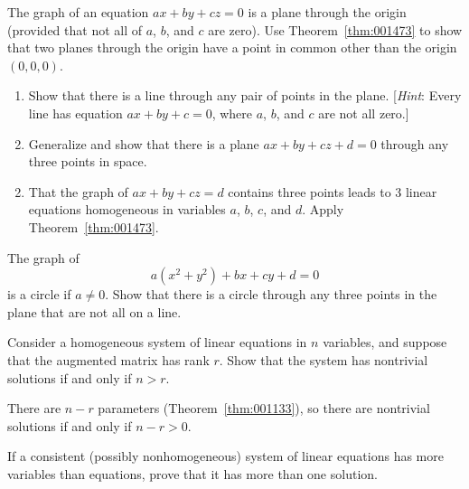 \begin{multicols}{2}
\begin{ex}
\begin{sol}
\begin{enumerate}[label={\alph*.}]
\end{enumerate}
\end{sol}
\end{ex}


\begin{ex}
The graph of an equation $ax + by + cz = 0$ is a plane through the origin (provided that not all of $a$, $b$, and $c$ are zero). Use Theorem~\ref{thm:001473} to show that two planes through the origin have a point in common other than the origin $(0, 0, 0)$.
\end{ex}

\begin{ex} %
\begin{enumerate}[label={\alph*.}]
\item Show that there is a line through any pair of points in the plane. [\textit{Hint}: Every line has equation $ax + by + c = 0$, where $a$, $b$, and $c$ are not all zero.]

\item Generalize and show that there is a plane $ax + by + cz + d = 0$ through any three points in space.

\end{enumerate}
\begin{sol}
\begin{enumerate}[label={\alph*.}]
\setcounter{enumi}{1}
\item  That the graph of $ax + by + cz = d$ contains three points leads to 3 linear equations homogeneous in variables $a$, $b$, $c$, and $d$. Apply Theorem~\ref{thm:001473}.

\end{enumerate}
\end{sol}
\end{ex}

\begin{ex} %
The graph of 
\begin{equation*}
a(x^2 + y^2) + bx + cy + d = 0
\end{equation*}
 is a circle if $a \neq 0$. Show that there is a circle through any three points in the plane that are not all on a line.
\end{ex}

\begin{ex} %
Consider a homogeneous system of linear equations in $n$ variables, and suppose that the augmented matrix has rank $r$. Show that the system has nontrivial solutions if and only if $n > r$.

\begin{sol}
There are $n - r$ parameters (Theorem~\ref{thm:001133}), so there are nontrivial solutions if and only if $n - r > 0$.
\end{sol}
\end{ex}

\begin{ex} %
If a consistent (possibly nonhomogeneous) system of linear equations has more variables than equations, prove that it has more than one solution.
\end{ex}
\end{multicols}
